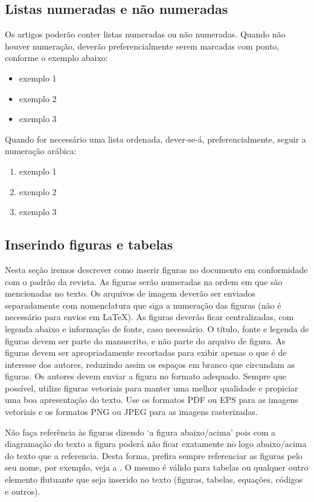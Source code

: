 \documentclass[anonymous=true]{textolivre}
\begin{document}
\lipsum

\subsection{Listas numeradas e não numeradas}\label{sec-listas}
Os artigos poderão conter listas numeradas ou não numeradas.  
Quando não houver numeração, deverão preferencialmente serem marcadas com ponto, conforme o exemplo abaixo: 
\begin{itemize}
\item exemplo 1
\item exemplo 2
\item exemplo 3
\end{itemize}
\lipsum[2]

Quando for necessário uma lista ordenada, dever-se-á, preferencialmente, seguir a numeração arábica:
\begin{enumerate}
\item exemplo 1
\item exemplo 2
\item exemplo 3
\end{enumerate}
\lipsum[3-4]


\subsection{Inserindo figuras e tabelas}\label{sec-figuras-tabelas}
Nesta seção iremos descrever como inserir figuras no documento em conformidade com o padrão da revista. 
As figuras serão numeradas na ordem em que são mencionadas no texto. Os arquivos de imagem deverão
ser enviados separadamente com nomenclatura que siga a numeração das figuras (não é necessário para envios em \LaTeX{}).
As figuras deverão ficar centralizadas, com legenda abaixo e informação de fonte, caso necessário.
O título, fonte e legenda de figuras devem ser parte do manuscrito, e não parte do arquivo de figura.
As figuras devem ser apropriadamente recortadas para exibir apenas o que é de interesse dos autores,
reduzindo assim os espaços em branco que circundam as figuras.
Os autores devem enviar a figura no formato adequado. 
Sempre que possível, utilize figuras vetoriais para manter uma melhor qualidade e propiciar uma boa apresentação do texto. 
Use os formatos PDF ou EPS para as imagens vetoriais e os formatos PNG ou JPEG para as imagens rasterizadas. 

Não faça referência às figuras dizendo `a figura abaixo/acima' pois com a diagramação do texto a figura poderá não ficar exatamente no logo abaixo/acima do texto que a referencia.
Desta forma, prefira sempre referenciar as figuras pelo seu nome, por exemplo, veja a . O mesmo é válido para tabelas ou qualquer outro elemento flutuante 
que seja inserido no texto (figuras, tabelas, equações, códigos e outros).
\end{document}
